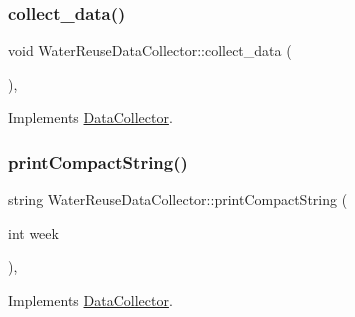 \subsubsection{\texorpdfstring{collect\+\_\+data()}{collect\_data()}}
{\footnotesize\ttfamily void Water\+Reuse\+Data\+Collector\+::collect\+\_\+data (\begin{DoxyParamCaption}{ }\end{DoxyParamCaption})\hspace{0.3cm}{\ttfamily [override]}, {\ttfamily [virtual]}}



Implements \mbox{\hyperlink{classDataCollector_a01486bf58acbe37b203f97b3b9a79c40_a01486bf58acbe37b203f97b3b9a79c40}{Data\+Collector}}.

\mbox{\label{classWaterReuseDataCollector_a6b37aa4b2031cf0a1a1326da2bd64420_a6b37aa4b2031cf0a1a1326da2bd64420}} 
\subsubsection{\texorpdfstring{print\+Compact\+String()}{printCompactString()}}
{\footnotesize\ttfamily string Water\+Reuse\+Data\+Collector\+::print\+Compact\+String (\begin{DoxyParamCaption}\item[{int}]{week }\end{DoxyParamCaption})\hspace{0.3cm}{\ttfamily [override]}, {\ttfamily [virtual]}}



Implements \mbox{\hyperlink{classDataCollector_a2eac264fa5612aed5a830b12de4f4ae3_a2eac264fa5612aed5a830b12de4f4ae3}{Data\+Collector}}.

\mbox{\label{classWaterReuseDataCollector_afef08bead3f2c60c2b9c975864456ef1_afef08bead3f2c60c2b9c975864456ef1}} 
